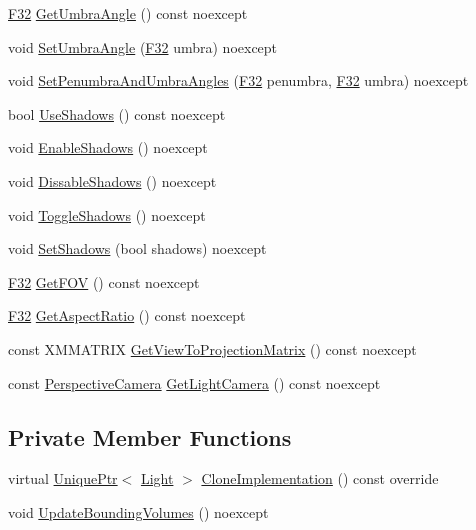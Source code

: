 \begin{DoxyCompactItemize}
\hyperlink{namespacemage_aa97e833b45f06d60a0a9c4fc22ae02c0}{F32} \hyperlink{classmage_1_1_spot_light_ae29059615f77f1afe414dc826b2d2af8}{Get\+Umbra\+Angle} () const noexcept
\item 
void \hyperlink{classmage_1_1_spot_light_aab2685ef31177d7e40ef964fb9bc0e24}{Set\+Umbra\+Angle} (\hyperlink{namespacemage_aa97e833b45f06d60a0a9c4fc22ae02c0}{F32} umbra) noexcept
\item 
void \hyperlink{classmage_1_1_spot_light_a7510d29df641a651bab5f3d393e18b60}{Set\+Penumbra\+And\+Umbra\+Angles} (\hyperlink{namespacemage_aa97e833b45f06d60a0a9c4fc22ae02c0}{F32} penumbra, \hyperlink{namespacemage_aa97e833b45f06d60a0a9c4fc22ae02c0}{F32} umbra) noexcept
\item 
bool \hyperlink{classmage_1_1_spot_light_af41a8c0d83b45d048a2d1a030c1235f8}{Use\+Shadows} () const noexcept
\item 
void \hyperlink{classmage_1_1_spot_light_a51694c316560929e6ae49c019d3dc763}{Enable\+Shadows} () noexcept
\item 
void \hyperlink{classmage_1_1_spot_light_ae43668c2ae4c041b8abf822e15ab2185}{Dissable\+Shadows} () noexcept
\item 
void \hyperlink{classmage_1_1_spot_light_ae81d5d3c485a85f373d5b7b861919a3c}{Toggle\+Shadows} () noexcept
\item 
void \hyperlink{classmage_1_1_spot_light_a290ce2f0ce8814cac75f05322fc01cd5}{Set\+Shadows} (bool shadows) noexcept
\item 
\hyperlink{namespacemage_aa97e833b45f06d60a0a9c4fc22ae02c0}{F32} \hyperlink{classmage_1_1_spot_light_a6cbc0ac77c28796cc25a7131bfe4a1c1}{Get\+F\+OV} () const noexcept
\item 
\hyperlink{namespacemage_aa97e833b45f06d60a0a9c4fc22ae02c0}{F32} \hyperlink{classmage_1_1_spot_light_a1cde0db1b5170fc602691652e1dc7f4b}{Get\+Aspect\+Ratio} () const noexcept
\item 
const X\+M\+M\+A\+T\+R\+IX \hyperlink{classmage_1_1_spot_light_abc2634b5fb5902100eb6f51127bae15e}{Get\+View\+To\+Projection\+Matrix} () const noexcept
\item 
const \hyperlink{classmage_1_1_perspective_camera}{Perspective\+Camera} \hyperlink{classmage_1_1_spot_light_ad702870b00f285bbedd76caa5eac26f5}{Get\+Light\+Camera} () const noexcept
\end{DoxyCompactItemize}
\subsection*{Private Member Functions}
\begin{DoxyCompactItemize}
\item 
virtual \hyperlink{namespacemage_a3316d7143a973e37adf1110f2e80ca31}{Unique\+Ptr}$<$ \hyperlink{classmage_1_1_light}{Light} $>$ \hyperlink{classmage_1_1_spot_light_a060044ae1de97143878ad26524f03709}{Clone\+Implementation} () const override
\item 
void \hyperlink{classmage_1_1_spot_light_a83035abee0050acdca47b1f95b30a793}{Update\+Bounding\+Volumes} () noexcept
\end{DoxyCompactItemize}
